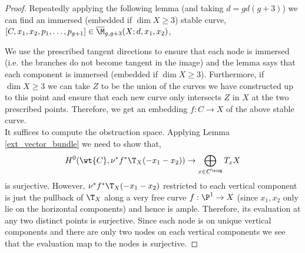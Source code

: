 \documentclass[12pt]{article}
\begin{document}
\begin{proof}
Repeatedly applying the following lemma (and taking $d = g d(g+3)$) we can find an immersed (embedded if $\dim{X} \ge 3$) stable curve, $[C, x_1, x_2, p_1, \dots, p_{g+1}] \in \overline{\M}_{g, g+3}(X; d, x_1, x_2)$, 
\begin{center}
\end{center}
We use the prescribed tangent directions to ensure that each node is immersed (i.e. the branches do not become tangent in the image) and the lemma says that each component is immersed (embedded if $\dim{X} \ge 3$). Furthermore, if $\dim{X} \ge 3$ we can take $Z$ to be the union of the curves we have constructed up to this point and ensure that each new curve only intersects $Z$ in $X$ at the two prescribed points. Therefore, we get an embedding $f : C \to X$ of the above stable curve.
\bigskip\\
It suffices to compute the obstruction space. Applying Lemma \ref{ext_vector_bundle} we need to show that,
\[ H^0(\wt{C}, \nu^* f^* \T_X(-x_1 - x_2)) \to \bigoplus_{x \in C^{\sing}} T_{x} X \]
is surjective. However, $\nu^* f^* \T_X(-x_1 - x_2)$ restricted to each vertical component is just the pullback of $\T_X$ along a very free  curve $f : \P^1 \to X$ (since $x_1, x_2$ only lie on the horizontal components) and hence is ample. Therefore, its evaluation at any two distinct points is surjective. Since each node is on unique vertical components and there are only two nodes on each vertical components we see that the evaluation map to the nodes is surjective.
\end{proof}
\end{document}
